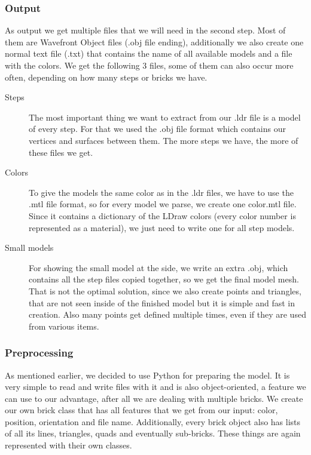\subsubsection{Output}
As output we get multiple files that we will need in the second step. Most of them are Wavefront Object files (.obj file ending), additionally we also create one normal text file (.txt) that contains the name of all available models and a file with the colors. We get the following 3 files, some of them can also occur more often, depending on how many steps or bricks we have.
\begin{description}
	\item[Steps]
	The most important thing we want to extract from our .ldr file is a model of every step. For that we used the .obj file format which contains our vertices and surfaces between them. The more steps we have, the more of these files we get.
	\item[Colors]
	To give the models the same color as in the .ldr files, we have to use the .mtl file format, so for every model we parse, we create one color.mtl file. Since it contains a dictionary of the LDraw colors (every color number is represented as a material), we just need to write one for all step models.
	\item[Small models]
	For showing the small model at the side, we write an extra .obj, which contains all the step files copied together, so we get the final model mesh. That is not the optimal solution, since we also create points and triangles, that are not seen inside of the finished model but it is simple and fast in creation. Also many points get defined multiple times, even if they are used from various items.
	
\end{description}


\subsubsection{Preprocessing}

As mentioned earlier, we decided to use Python for preparing the model. It is very simple to read and write files with it and is also object-oriented, a feature we can use to our advantage, after all we are dealing with multiple bricks. 
We create our own brick class that has all features that we get from our input: color, position, orientation and file name. Additionally, every brick object also has lists of all its lines, triangles, quads and eventually sub-bricks. These things are again represented with their own classes. 

